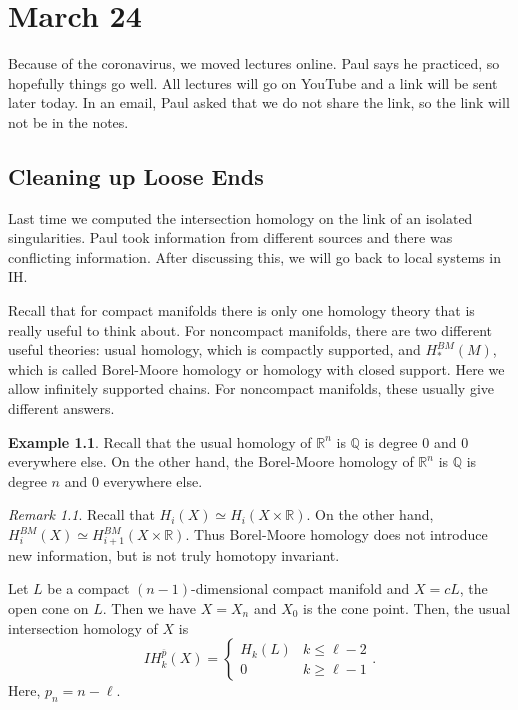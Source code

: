 \documentclass[leqno, openany]{memoir}
\theoremstyle{definition}
\newtheorem{exm}[thm]{Example}
\theoremstyle{remark}
\newtheorem{rmk}[thm]{Remark}
\theoremstyle{plain}
\theoremstyle{definition}
\theoremstyle{remark}
\newcommand{\R}{\mathbb{R}}
\newcommand{\Q}{\mathbb{Q}}
\begin{document}
\chapter{March 24}%
\label{cha:march_24}

Because of the coronavirus, we moved lectures online. Paul says he practiced, so hopefully things go well. All lectures will go on YouTube and a link will be sent later today. In an email, Paul asked that we do not share the link, so the link will not be in the notes.

\section{Cleaning up Loose Ends}%
\label{sec:cleaning_up_loose_ends}

Last time we computed the intersection homology on the link of an isolated singularities. Paul took information from different sources and there was conflicting information. After discussing this, we will go back to local systems in IH.

Recall that for compact manifolds there is only one homology theory that is really useful to think about. For noncompact manifolds, there are two different useful theories: usual homology, which is compactly supported, and $H_*^{BM}(M)$, which is called Borel-Moore homology or homology with closed support. Here we allow infinitely supported chains. For noncompact manifolds, these usually give different answers.

\begin{exm}
    Recall that the usual homology of $\R^n$ is $\Q$ is degree $0$ and $0$ everywhere else. On the other hand, the Borel-Moore homology of $\R^n$ is $\Q$ is degree $n$ and $0$ everywhere else.
\end{exm}

\begin{rmk}
    Recall that $H_i(X) \simeq H_i(X \times \R)$. On the other hand, $H_i^{BM}(X) \simeq H_{i+1}^{BM}(X \times \R)$. Thus Borel-Moore homology does not introduce new information, but is not truly homotopy invariant.
\end{rmk}

Let $L$ be a compact $(n-1)$-dimensional compact manifold and $X = cL$, the open cone on $L$. Then we have $X = X_n$ and $X_0$ is the cone point. Then, the usual intersection homology of $X$ is
\[ IH_k^{\overline{p}}(X) = \begin{cases}
    H_k(L) & k \leq \ell - 2 \\
    0 & k \geq \ell - 1
\end{cases}. \]
Here, $p_n = n - \ell$.
\end{document}
